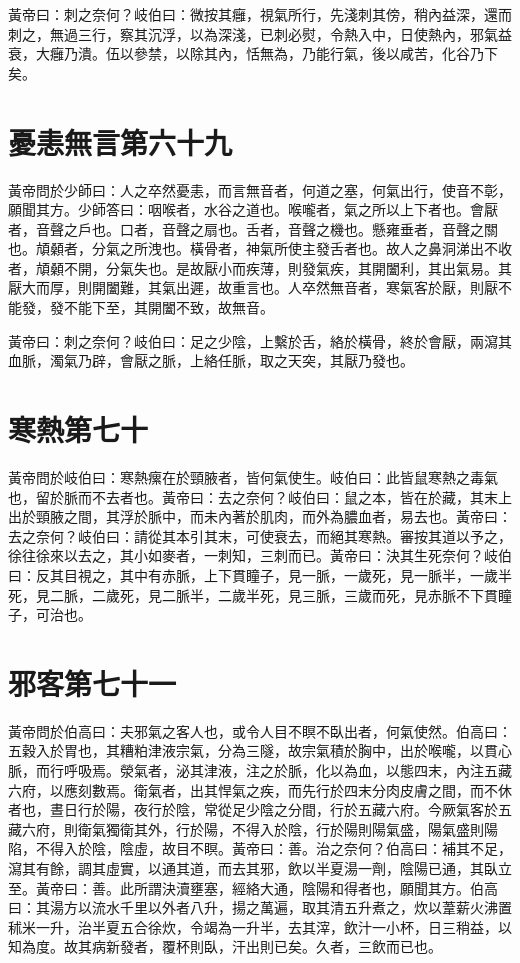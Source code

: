 黃帝曰：刺之奈何？岐伯曰：微按其癰，視氣所行，先淺刺其傍，稍內益深，還而刺之，無過三行，察其沉浮，以為深淺，已刺必熨，令熱入中，日使熱內，邪氣益衰，大癰乃潰。伍以參禁，以除其內，恬無為，乃能行氣，後以咸苦，化谷乃下矣。



\section{憂恚無言第六十九}

黃帝問於少師曰：人之卒然憂恚，而言無音者，何道之塞，何氣出行，使音不彰，願聞其方。少師答曰：咽喉者，水谷之道也。喉嚨者，氣之所以上下者也。會厭者，音聲之戶也。口者，音聲之扇也。舌者，音聲之機也。懸雍垂者，音聲之關也。頏顙者，分氣之所洩也。橫骨者，神氣所使主發舌者也。故人之鼻洞涕出不收者，頏顙不開，分氣失也。是故厭小而疾薄，則發氣疾，其開闔利，其出氣易。其厭大而厚，則開闔難，其氣出遲，故重言也。人卒然無音者，寒氣客於厭，則厭不能發，發不能下至，其開闔不致，故無音。

黃帝曰：刺之奈何？岐伯曰：足之少陰，上繫於舌，絡於橫骨，終於會厭，兩瀉其血脈，濁氣乃辟，會厭之脈，上絡任脈，取之天突，其厭乃發也。



\section{寒熱第七十}

黃帝問於岐伯曰：寒熱瘰在於頸腋者，皆何氣使生。岐伯曰：此皆鼠寒熱之毒氣也，留於脈而不去者也。黃帝曰：去之奈何？岐伯曰：鼠之本，皆在於藏，其末上出於頸腋之間，其浮於脈中，而未內著於肌肉，而外為膿血者，易去也。黃帝曰：去之奈何？岐伯曰：請從其本引其末，可使衰去，而絕其寒熱。審按其道以予之，徐往徐來以去之，其小如麥者，一刺知，三刺而已。黃帝曰：決其生死奈何？岐伯曰：反其目視之，其中有赤脈，上下貫瞳子，見一脈，一歲死，見一脈半，一歲半死，見二脈，二歲死，見二脈半，二歲半死，見三脈，三歲而死，見赤脈不下貫瞳子，可治也。



\section{邪客第七十一}

黃帝問於伯高曰：夫邪氣之客人也，或令人目不瞑不臥出者，何氣使然。伯高曰：五穀入於胃也，其糟粕津液宗氣，分為三隧，故宗氣積於胸中，出於喉嚨，以貫心脈，而行呼吸焉。滎氣者，泌其津液，注之於脈，化以為血，以態四末，內注五藏六府，以應刻數焉。衛氣者，出其悍氣之疾，而先行於四末分肉皮膚之間，而不休者也，晝日行於陽，夜行於陰，常從足少陰之分間，行於五藏六府。今厥氣客於五藏六府，則衛氣獨衛其外，行於陽，不得入於陰，行於陽則陽氣盛，陽氣盛則陽陷，不得入於陰，陰虛，故目不瞑。黃帝曰：善。治之奈何？伯高曰：補其不足，瀉其有餘，調其虛實，以通其道，而去其邪，飲以半夏湯一劑，陰陽已通，其臥立至。黃帝曰：善。此所謂決瀆壅塞，經絡大通，陰陽和得者也，願聞其方。伯高曰：其湯方以流水千里以外者八升，揚之萬遍，取其清五升煮之，炊以葦薪火沸置秫米一升，治半夏五合徐炊，令竭為一升半，去其滓，飲汁一小杯，日三稍益，以知為度。故其病新發者，覆杯則臥，汗出則已矣。久者，三飲而已也。

